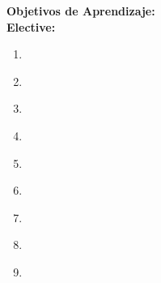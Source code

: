 \noindent \textbf{Objetivos de Aprendizaje:}\\
\noindent \textbf{Elective:}
\begin{enumerate}
	\setcounter{enumi}{0}
	\item \IMPhysicalDatabaseDesignLOExplainTheRecords\xspace[\IMPhysicalDatabaseDesignLOExplainTheRecordsLevel]\label{sec:BOK:IMPhysicalDatabaseDesignLOExplainTheRecords}
	\item \IMPhysicalDatabaseDesignLOGiveExamples\xspace[\IMPhysicalDatabaseDesignLOGiveExamplesLevel]\label{sec:BOK:IMPhysicalDatabaseDesignLOGiveExamples}
	\item \IMPhysicalDatabaseDesignLODistinguish\xspace[\IMPhysicalDatabaseDesignLODistinguishLevel]\label{sec:BOK:IMPhysicalDatabaseDesignLODistinguish}
	\item \IMPhysicalDatabaseDesignLOImplementDynamic\xspace[\IMPhysicalDatabaseDesignLOImplementDynamicLevel]\label{sec:BOK:IMPhysicalDatabaseDesignLOImplementDynamic}
	\item \IMPhysicalDatabaseDesignLOExplainTheApplication\xspace[\IMPhysicalDatabaseDesignLOExplainTheApplicationLevel]\label{sec:BOK:IMPhysicalDatabaseDesignLOExplainTheApplication}
	\item \IMPhysicalDatabaseDesignLOUseHashing\xspace[\IMPhysicalDatabaseDesignLOUseHashingLevel]\label{sec:BOK:IMPhysicalDatabaseDesignLOUseHashing}
	\item \IMPhysicalDatabaseDesignLODescribeTheHashing\xspace[\IMPhysicalDatabaseDesignLODescribeTheHashingLevel]\label{sec:BOK:IMPhysicalDatabaseDesignLODescribeTheHashing}
	\item \IMPhysicalDatabaseDesignLOEvaluateCosts\xspace[\IMPhysicalDatabaseDesignLOEvaluateCostsLevel]\label{sec:BOK:IMPhysicalDatabaseDesignLOEvaluateCosts}
	\item \IMPhysicalDatabaseDesignLOExplainHowDesignTransaction\xspace[\IMPhysicalDatabaseDesignLOExplainHowDesignTransactionLevel]\label{sec:BOK:IMPhysicalDatabaseDesignLOExplainHowDesignTransaction}
\end{enumerate}



